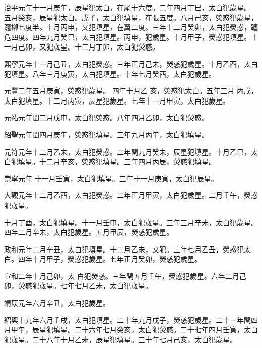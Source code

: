 \begin{pinyinscope}
 治平元年十一月庚午，辰星犯太白，在尾十六度。二年四月丁巳，太白犯歲星。
 五月癸亥，辰星犯太白。戊子，太白犯填星，在張五度。八月己亥，熒惑犯歲星，躔柳七度半。十月丙申，又犯填星，在翼二度。三年十二月癸卯，太白犯熒惑，躔危四度。四年九月癸巳，太白犯填星。丙申，犯歲星。十月甲子，熒惑犯填星。十一月己卯，又犯歲星。十二月丁卯，太白犯熒惑。



 熙寧元年十一月己丑，太白犯熒惑。三年正月己未，熒惑犯歲星。十月乙酉，太白犯填星。八年三月庚寅，太白犯填星。十年七月癸酉，太白犯歲星。



 元豐二年五月庚寅，熒惑犯歲星。
 四年十月乙
 亥，熒惑犯太白。五年三月
 丙戌，太白犯填星。十二月丙寅，辰星犯歲星。七年十一月甲寅，太白犯歲星。



 元祐元年閏二月戊申，太白犯熒惑。八年四月乙卯，太白犯熒惑。



 紹聖元年閏四月庚午，熒惑犯填星。三年九月丙午，太白犯填星。



 元符元年十二月乙未，太白犯熒惑。二年閏九月癸未，辰星犯填星。十月乙巳，太白犯填星。十二月辛亥，熒惑犯填星。三年四月丙辰，熒惑犯填星。



 崇寧元年
 十一月壬寅，太白犯填星。三年十一月庚寅，太白犯辰星。



 大觀元年十二月乙酉，太白犯熒惑。二年正月甲寅，太白犯歲星。二月壬午，熒惑犯歲星。



 十月丁酉，太白犯填星。十一月壬申，太白犯歲星。三年三月辛未，太白犯歲星。四年二月辛未，太白犯歲星。五月甲辰，熒惑犯歲星。



 政和元年二月辛丑，太白犯填星。十二月乙未，又犯。三年七月乙丑，熒惑犯太白。四年十月甲子，熒惑犯歲星。七年正月癸卯，熒惑犯歲星。



 宣和二年十月己卯，太
 白犯熒惑。三年閏五月壬午，熒惑犯歲星。六年二月己卯，熒惑犯歲星。七年七月乙未，太白犯歲星。



 靖康元年六月辛丑，太白犯歲星。



 紹興十九年六月壬戌，太白犯填星。二十年九月戊子，熒惑犯歲星。二十一年閏四月甲午，辰星犯填星。二十六年七月癸亥，太白犯熒惑。二十七年四月壬寅，太白犯歲星。二十八年十月乙未，辰星犯填星。三十年七月己亥，太白犯歲星。




\end{pinyinscope}
